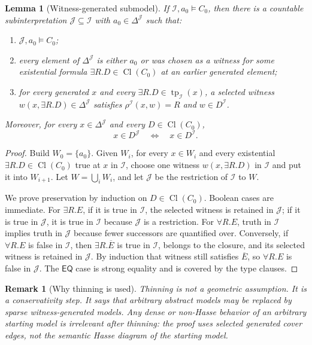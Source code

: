 \documentclass[11pt]{article}
\newtheorem{lemma}[theorem]{Lemma}
\newtheorem{remark}[theorem]{Remark}
\newcommand{\Cl}{\operatorname{Cl}}
\newcommand{\EQ}{\mathsf{EQ}}
\newcommand{\I}{\mathcal I}
\newcommand{\J}{\mathcal J}
\newcommand{\typ}{\operatorname{tp}}
\begin{document}
\begin{lemma}[Witness-generated submodel]\label{lem:thinning}
If \(\I,a_0\models C_0\), then there is a countable subinterpretation \(\J\subseteq\I\) with \(a_0\in\Delta^\J\) such that:
\begin{enumerate}[label=(W\arabic*)]
\item \(\J,a_0\models C_0\);
\item every element of \(\Delta^\J\) is either \(a_0\) or was chosen as a witness for some existential formula \(\exists R.D\in\Cl(C_0)\) at an earlier generated element;
\item for every generated \(x\) and every \(\exists R.D\in\typ_\I(x)\), a selected witness \(w(x,\exists R.D)\in\Delta^\J\) satisfies \(\rho^\I(x,w)=R\) and \(w\in D^\I\).
\end{enumerate}
Moreover, for every \(x\in\Delta^\J\) and every \(D\in\Cl(C_0)\),
\[
  x\in D^\J \quad\Longleftrightarrow\quad x\in D^\I .
\]
\end{lemma}

\begin{proof}
Build \(W_0=\{a_0\}\).  Given \(W_i\), for every \(x\in W_i\) and every existential \(\exists R.D\in\Cl(C_0)\) true at \(x\) in \(\I\), choose one witness \(w(x,\exists R.D)\) in \(\I\) and put it into \(W_{i+1}\).  Let \(W=\bigcup_i W_i\), and let \(\J\) be the restriction of \(\I\) to \(W\).

We prove preservation by induction on \(D\in\Cl(C_0)\).  Boolean cases are immediate.  For \(\exists R.E\), if it is true in \(\I\), the selected witness is retained in \(\J\); if it is true in \(\J\), it is true in \(\I\) because \(\J\) is a restriction.  For \(\forall R.E\), truth in \(\I\) implies truth in \(\J\) because fewer successors are quantified over.  Conversely, if \(\forall R.E\) is false in \(\I\), then \(\exists R.\overline E\) is true in \(\I\), belongs to the closure, and its selected witness is retained in \(\J\).  By induction that witness still satisfies \(\overline E\), so \(\forall R.E\) is false in \(\J\).  The \(\EQ\) case is strong equality and is covered by the type clauses.
\end{proof}

\begin{remark}[Why thinning is used]
Thinning is not a geometric assumption.  It is a conservativity step.  It says that arbitrary abstract models may be replaced by sparse witness-generated models.  Any dense or non-Hasse behavior of an arbitrary starting model is irrelevant after thinning: the proof uses selected generated cover edges, not the semantic Hasse diagram of the starting model.
\end{remark}
\end{document}
